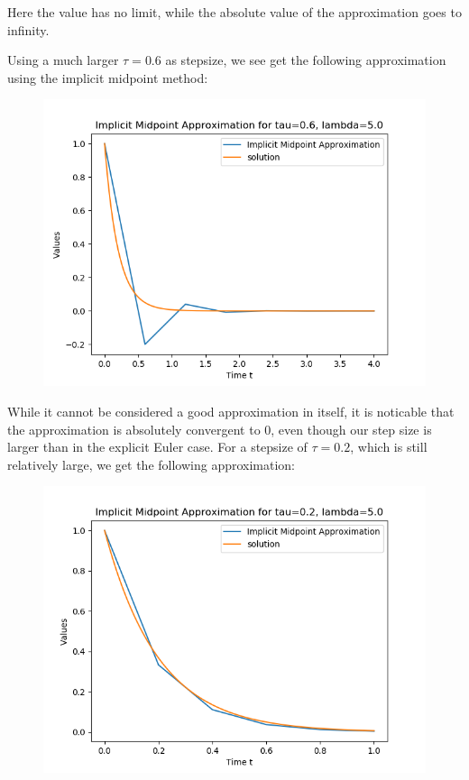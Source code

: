 \documentclass{article}
\begin{document}
\begin{itemize}
\begin{figure}[H]
		\end{figure}
		Here the value has no limit, while the absolute value of the
		approximation goes to infinity.

		Using a much larger $\tau = 0.6$ as stepsize, we see get the
		following approximation using
		the implicit midpoint method:
		\begin{figure}[H]
			\includegraphics[scale=0.6]{implicit_mid_06}
		\end{figure}
		While it cannot be considered a good approximation in itself, it
		is noticable that the approximation is absolutely convergent to
		$0$, even though our step size is larger than in the explicit
		Euler case. For a stepsize of $\tau=0.2$, which is still
		relatively large, we get the following approximation:
		\begin{figure}[H]
			\includegraphics[scale=0.6]{implicit_mid_02}

\end{figure}
\end{itemize}
\end{document}
